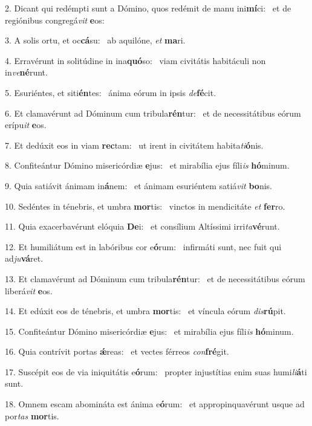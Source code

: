 2. Dicant qui redémpti sunt a Dómino, quos redémit de manu ini\textbf{mí}ci: \ast\  et de regiónibus congregá\textit{vit} \textbf{e}os:\

3. A solis ortu, et oc\textbf{cá}su: \ast\  ab aquilóne, \textit{et} \textbf{ma}ri.\

4. Erravérunt in solitúdine in ina\textbf{quó}so: \ast\  viam civitátis habitáculi non in\textit{ve}\textbf{né}runt.\

5. Esuriéntes, et siti\textbf{én}tes: \ast\  ánima eórum in ipsis \textit{de}\textbf{fé}cit.\

6. Et clamavérunt ad Dóminum cum tribula\textbf{rén}tur: \ast\  et de necessitátibus eórum erípu\textit{it} \textbf{e}os.\

7. Et dedúxit eos in viam \textbf{rec}tam: \ast\  ut irent in civitátem habita\textit{ti}\textbf{ó}nis.\

8. Confiteántur Dómino misericórdiæ \textbf{e}jus: \ast\  et mirabília ejus fíli\textit{is} \textbf{hó}minum.\

9. Quia satiávit ánimam in\textbf{á}nem: \ast\  et ánimam esuriéntem satiá\textit{vit} \textbf{bo}nis.\

10. Sedéntes in ténebris, et umbra \textbf{mor}tis: \ast\  vinctos in mendicitáte \textit{et} \textbf{fer}ro.\

11. Quia exacerbavérunt elóquia \textbf{De}i: \ast\  et consílium Altíssimi irri\textit{ta}\textbf{vé}runt.\

12. Et humiliátum est in labóribus cor e\textbf{ó}rum: \ast\  infirmáti sunt, nec fuit qui ad\textit{ju}\textbf{vá}ret.\

13. Et clamavérunt ad Dóminum cum tribula\textbf{rén}tur: \ast\  et de necessitátibus eórum liberá\textit{vit} \textbf{e}os.\

14. Et edúxit eos de ténebris, et umbra \textbf{mor}tis: \ast\  et víncula eórum \textit{dis}\textbf{rú}pit.\

15. Confiteántur Dómino misericórdiæ \textbf{e}jus: \ast\  et mirabília ejus fíli\textit{is} \textbf{hó}minum.\

16. Quia contrívit portas \textbf{ǽ}reas: \ast\  et vectes férreos \textit{con}\textbf{fré}git.\

17. Suscépit eos de via iniquitátis e\textbf{ó}rum: \ast\  propter injustítias enim suas humi\textit{li}\textbf{á}ti sunt.\

18. Omnem escam abomináta est ánima e\textbf{ó}rum: \ast\  et appropinquavérunt usque ad por\textit{tas} \textbf{mor}tis.\

